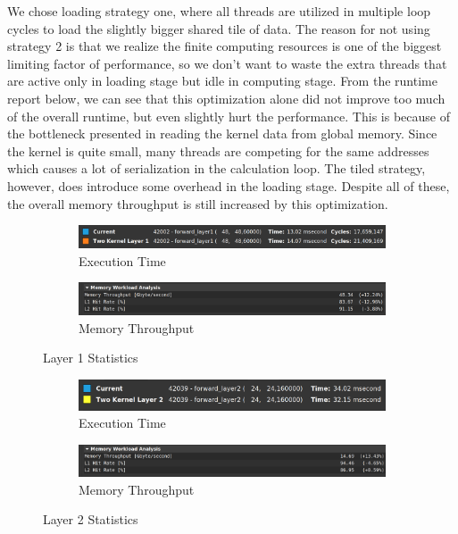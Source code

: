 \documentclass{article}
\begin{document}
\par
We chose loading strategy one, where all threads are utilized in multiple loop
cycles to load the slightly bigger shared tile of data. The reason for not using
strategy 2 is that we realize the finite computing resources is one of the
biggest limiting factor of performance, so we don't want to waste the extra threads
that are active only in loading stage but idle in computing stage. From the runtime
report below, we can see that this optimization alone did not improve too much
of the overall runtime, but even
slightly hurt the performance. This is because of the bottleneck presented
in reading the kernel data from global memory. Since the kernel is quite small,
many threads are competing for the same addresses which causes a lot of serialization
in the calculation loop. The tiled strategy, however, does introduce some overhead
in the loading stage. Despite all of these, the overall memory throughput is still
increased by this optimization.

\begin{figure}[H]
    \centering
    \begin{subfigure}[b]{\linewidth}
        \includegraphics[width=\linewidth]{shared_layer1_runtime}
        \caption{Execution Time}
    \end{subfigure}
    \begin{subfigure}[b]{\linewidth}
        \includegraphics[width=\linewidth]{shared_layer1_mem}
        \caption{Memory Throughput}
    \end{subfigure}
    \caption{Layer 1 Statistics}
\end{figure}

\begin{figure}[H]
    \centering
    \begin{subfigure}[b]{\linewidth}
        \includegraphics[width=\linewidth]{shared_layer2_runtime}
        \caption{Execution Time}
    \end{subfigure}
    \begin{subfigure}[b]{\linewidth}
        \includegraphics[width=\linewidth]{shared_layer2_mem}
        \caption{Memory Throughput}
    \end{subfigure}
    \caption{Layer 2 Statistics}
\end{figure}
\end{document}
